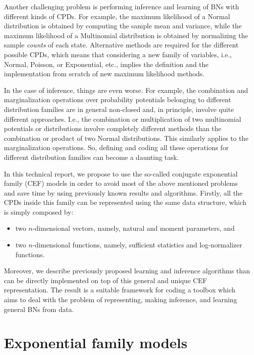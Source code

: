 \documentclass[11pt, oneside]{article}   	%
\numberwithin{figure}{section}
\numberwithin{equation}{section}
\numberwithin{table}{section}
\theoremstyle{definition}
\begin{document}
Another challenging problem is performing inference and learning of BNs with different kinds of CPDs. For example, the maximum likelihood of a Normal distribution is obtained by computing the sample mean and variance, while the maximum likelihood of a Multinomial distribution is obtained by normalizing the sample \textit{counts} of each state. Alternative methods are required for the different possible CPDs, which means that considering a new family of variables, i.e., Normal, Poisson, or Exponential, etc., implies the definition and the implementation from scratch of new maximum likelihood methods.  

In the case of inference, things are even worse. For example, the combination and marginalization operations over probability potentials belonging to different distribution families are in general non-closed and, in principle, involve quite different approaches. I.e., the combination or multiplication of two multinomial potentials or distributions involve completely different methods than the combination or product of two Normal distributions. This similarly applies to the marginalization operations. So, defining and coding all these operations for different distribution families can become a daunting task. 

In this technical report, we propose to use the so-called conjugate exponential family (CEF) models in order to avoid most of the above mentioned problems and save time by using previously known results and algorithms. Firstly, all the CPDs inside this family can be represented using the same data structure, which is simply composed by: 

\begin{itemize}
\item two $n$-dimensional vectors, namely, natural and moment parameters, and
\item two $n$-dimensional functions, namely, sufficient statistics and log-normalizer functions.
\end{itemize}

Moreover, we describe previously proposed learning and inference algorithms than can be directly implemented on top of this general and unique CEF representation. The result is a suitable framework for coding a toolbox which aims to deal with the problem of representing, making inference, and learning general BNs from data.

\section{Exponential family models}
\end{document}

